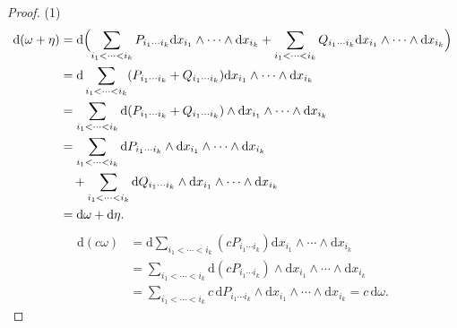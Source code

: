 \begin{proof}
(1)
\[
\begin{aligned}
\mathrm{d}(\omega+\eta)&=\mathrm{d}\Bigl(\sum_{i_{1}<\cdots<i_{k}}P_{i_{1}\cdots i_{k}}\mathrm{d}x_{i_{1}}\wedge\cdots\wedge\mathrm{d}x_{i_{k}}+\sum_{i_{1}<\cdots<i_{k}}Q_{i_{1}\cdots i_{k}}\mathrm{d}x_{i_{1}}\wedge\cdots\wedge\mathrm{d}x_{i_{k}}\Bigr)\\
&=\mathrm{d}\sum_{i_{1}<\cdots<i_{k}}(P_{i_{1}\cdots i_{k}}+Q_{i_{1}\cdots i_{k}})\mathrm{d}x_{i_{1}}\wedge\cdots\wedge\mathrm{d}x_{i_{k}}\\
&=\sum_{i_{1}<\cdots<i_{k}}\mathrm{d}(P_{i_{1}\cdots i_{k}}+Q_{i_{1}\cdots i_{k}})\wedge\mathrm{d}x_{i_{1}}\wedge\cdots\wedge\mathrm{d}x_{i_{k}}\\
&=\sum_{i_{1}<\cdots<i_{k}}\mathrm{d}P_{i_{1}\cdots i_{k}}\wedge\mathrm{d}x_{i_{1}}\wedge\cdots\wedge\mathrm{d}x_{i_{k}}\\
&\quad+\sum_{i_{1}<\cdots<i_{k}}\mathrm{d}Q_{i_{1}\cdots i_{k}}\wedge\mathrm{d}x_{i_{1}}\wedge\cdots\wedge\mathrm{d}x_{i_{k}}\\
&=\mathrm{d}\omega+\mathrm{d}\eta.
\end{aligned}
\]
\[
\begin{aligned}
\mathrm{d}(c\omega)&=\mathrm{d}\sum_{i_{1}<\cdots<i_{k}}(cP_{i_{1}\cdots i_{k}})\mathrm{d}x_{i_{1}}\wedge\cdots\wedge\mathrm{d}x_{i_{k}}\\
&=\sum_{i_{1}<\cdots<i_{k}}\mathrm{d}(cP_{i_{1}\cdots i_{k}})\wedge\mathrm{d}x_{i_{1}}\wedge\cdots\wedge\mathrm{d}x_{i_{k}}\\
&=\sum_{i_{1}<\cdots<i_{k}}c\,\mathrm{d}P_{i_{1}\cdots i_{k}}\wedge\mathrm{d}x_{i_{1}}\wedge\cdots\wedge\mathrm{d}x_{i_{k}}=c\,\mathrm{d}\omega.
\end{aligned}
\]


\end{proof}
